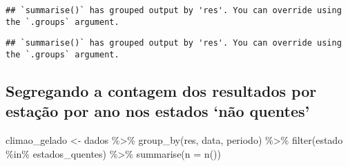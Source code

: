 \documentclass[
]{article}
\newenvironment{Shaded}{\begin{snugshade}}{\end{snugshade}}
\newcommand{\AttributeTok}[1]{\textcolor[rgb]{0.77,0.63,0.00}{#1}}
\newcommand{\FunctionTok}[1]{\textcolor[rgb]{0.00,0.00,0.00}{#1}}
\newcommand{\NormalTok}[1]{#1}
\newcommand{\OtherTok}[1]{\textcolor[rgb]{0.56,0.35,0.01}{#1}}
\newcommand{\SpecialCharTok}[1]{\textcolor[rgb]{0.00,0.00,0.00}{#1}}
\newcommand{\StringTok}[1]{\textcolor[rgb]{0.31,0.60,0.02}{#1}}
\begin{document}
\begin{verbatim}
## `summarise()` has grouped output by 'res'. You can override using the `.groups` argument.
\end{verbatim}

\begin{Shaded}
\end{Shaded}

\begin{verbatim}
## `summarise()` has grouped output by 'res'. You can override using the `.groups` argument.
\end{verbatim}

\hypertarget{segregando-a-contagem-dos-resultados-por-estauxe7uxe3o-por-ano-nos-estados-nuxe3o-quentes}{%
\subsection{Segregando a contagem dos resultados por estação por ano nos
estados `não
quentes'}\label{segregando-a-contagem-dos-resultados-por-estauxe7uxe3o-por-ano-nos-estados-nuxe3o-quentes}}

\begin{Shaded}
\begin{Highlighting}[]
\NormalTok{climao\_gelado }\OtherTok{\textless{}{-}}\NormalTok{ dados }\SpecialCharTok{\%\textgreater{}\%} \FunctionTok{group\_by}\NormalTok{(res, data, periodo) }\SpecialCharTok{\%\textgreater{}\%} \FunctionTok{filter}\NormalTok{(estado }\SpecialCharTok{\%in\%}\NormalTok{ estados\_quentes) }\SpecialCharTok{\%\textgreater{}\%}
  \FunctionTok{summarise}\NormalTok{(}\AttributeTok{n =} \FunctionTok{n}\NormalTok{())}
\end{Highlighting}
\end{Shaded}
\end{document}
